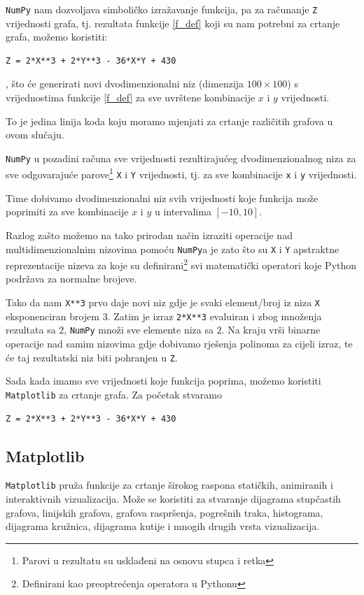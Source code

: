 \newpage
\verb|NumPy| nam dozvoljava simboličko izražavanje funkcija,
pa za računanje \verb|Z| vrijednosti grafa, tj. rezultata funkcije \eqref{f_def} koji su nam
potrebni za crtanje grafa, možemo koristiti:
\begin{verbatim}
Z = 2*X**3 + 2*Y**3 - 36*X*Y + 430
\end{verbatim}
, što će generirati novi dvodimenzionalni niz (dimenzija $100\times100$) s vrijednostima
funkcije \eqref{f_def} za sve uvrštene kombinacije $x$ i $y$ vrijednosti.\par
To je jedina linija koda koju moramo mjenjati za crtanje različitih grafova u ovom slučaju.
\bigskip

\verb|NumPy| u pozadini računa sve vrijednosti rezultirajućeg dvodimenzionalnog niza za sve odgovarajuće
parove\footnote{Parovi u rezultatu su usklađeni na osnovu stupca i retka} \verb|X| i \verb|Y| vrijednosti,
tj. za sve kombinacije \verb|x| i \verb|y| vrijednosti.

Time dobivamo dvodimenzionalni niz svih vrijednosti koje funkcija može poprimiti za sve kombinacije $x$ i $y$ u intervalima $[-10, 10]$.
\bigskip

Razlog zašto možemo na tako prirodan način izraziti operacije nad multidimenzionalnim nizovima pomoću \verb|NumPy|a je zato što su
\verb|X| i \verb|Y| apstraktne reprezentacije nizeva za koje su definirani\footnote{Definirani kao preoptrećenja operatora u Pythonu} svi matematički operatori koje Python podržava za normalne brojeve.\par
Tako da nam \verb|X**3| prvo daje novi niz gdje je svaki element/broj iz niza \verb|X| eksponenciran brojem $3$.
Zatim je izraz \verb|2*X**3| evaluiran i zbog množenja rezultata sa $2$, \verb|NumPy| množi sve elemente niza sa $2$.
Na kraju vrši binarne operacije nad samim nizovima gdje dobivamo rješenja polinoma za cijeli izraz, te će taj rezultatski niz biti pohranjen u \verb|Z|.
\bigskip

Sada kada imamo sve vrijednosti koje funkcija poprima, možemo koristiti \verb|Matplotlib| za crtanje grafa. Za početak stvaramo 
\begin{verbatim}
Z = 2*X**3 + 2*Y**3 - 36*X*Y + 430
\end{verbatim}

\newpage
\subsection{Matplotlib}

\verb|Matplotlib| pruža funkcije za crtanje širokog raspona statičkih, animiranih i interaktivnih vizualizacija.
Može se koristiti za stvaranje dijagrama stupčastih grafova, linijskih grafova, grafova raspršenja, pogrešnih traka,
histograma, dijagrama kružnica, dijagrama kutije i mnogih drugih vrsta vizualizacija.


